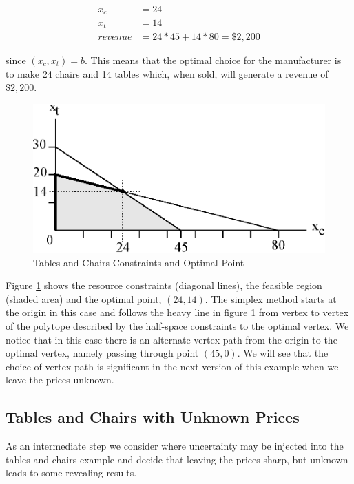 \begin{align*}
x_c &= 24\\
x_t &= 14\\
revenue &= 24*45 + 14*80 = \$2,200
\end{align*}

since $(x_c, x_t) = b$. This means that the optimal choice for the
manufacturer is to make 24 chairs and 14 tables which, when sold, will
generate a revenue of $\$2,200$.

\begin{figure}
  \centering
  \includegraphics[width=120mm]{Images/tables_and_chairs}
  \caption[Tables and Chairs Constraints and Optimal Point]
          {Tables and Chairs Constraints and Optimal Point}
  \label{fig:tables_and_chairs}
\end{figure}

Figure \ref{fig:tables_and_chairs} shows the resource constraints
(diagonal lines), the feasible region (shaded area) and the optimal
point, $(24,14)$. The simplex method starts at the origin in this case
and follows the heavy line in figure \ref{fig:tables_and_chairs} from
vertex to vertex of the polytope described by the half-space
constraints to the optimal vertex. We notice that in this case there
is an alternate vertex-path from the origin to the optimal vertex,
namely passing through point $(45,0)$. We will see that the choice of
vertex-path is significant in the next version of this example when we
leave the prices unknown.

\subsection{Tables and Chairs with Unknown Prices}

As an intermediate step we consider where uncertainty may be injected
into the tables and chairs example and decide that leaving the prices
sharp, but unknown leads to some revealing results.

